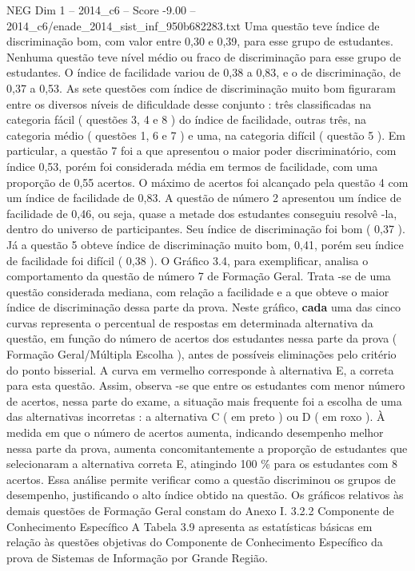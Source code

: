 \begin{textsample}{NEG Dim 1 – 2014\_c6 – Score -9.00 – 2014\_c6/enade\_2014\_sist\_inf\_950b682283.txt}
Uma questão teve índice de discriminação bom, com valor entre 0,30 e 0,39, para esse grupo de estudantes.
Nenhuma questão teve nível médio ou fraco de discriminação para esse grupo de estudantes.
O índice de facilidade variou de 0,38 a 0,83, e o de discriminação, de 0,37 a 0,53.
As sete questões com índice de discriminação muito bom figuraram entre os diversos níveis de dificuldade desse conjunto : três classificadas na categoria fácil ( questões 3, 4 e 8 ) do índice de facilidade, outras três, na categoria médio ( questões 1, 6 e 7 ) e uma, na categoria difícil ( questão 5 ).
Em particular, a questão 7 foi a que apresentou o maior poder discriminatório, com índice 0,53, porém foi considerada média em termos de facilidade, com uma proporção de 0,55 acertos.
O máximo de acertos foi alcançado pela questão 4 com um índice de facilidade de 0,83.
A questão de número 2 apresentou um índice de facilidade de 0,46, ou seja, quase a metade dos estudantes conseguiu resolvê -la, dentro do universo de participantes.
Seu índice de discriminação foi bom ( 0,37 ).
Já a questão 5 obteve índice de discriminação muito bom, 0,41, porém seu índice de facilidade foi difícil ( 0,38 ).
O Gráfico 3.4, para exemplificar, analisa o comportamento da questão de número 7 de Formação Geral.
Trata -se de uma questão considerada mediana, com relação a facilidade e a que obteve o maior índice de discriminação dessa parte da prova.
Neste gráfico, \textbf{cada} uma das cinco curvas representa o percentual de respostas em determinada alternativa da questão, em função do número de acertos dos estudantes nessa parte da prova ( Formação Geral/Múltipla Escolha ), antes de possíveis eliminações pelo critério do ponto bisserial.
A curva em vermelho corresponde à alternativa E, a correta para esta questão.
Assim, observa -se que entre os estudantes com menor número de acertos, nessa parte do exame, a situação mais frequente foi a escolha de uma das alternativas incorretas : a alternativa C ( em preto ) ou D ( em roxo ).
À medida em que o número de acertos aumenta, indicando desempenho melhor nessa parte da prova, aumenta concomitantemente a proporção de estudantes que selecionaram a alternativa correta E, atingindo 100 \% para os estudantes com 8 acertos.
Essa análise permite verificar como a questão discriminou os grupos de desempenho, justificando o alto índice obtido na questão.
Os gráficos relativos às demais questões de Formação Geral constam do Anexo I. 3.2.2 Componente de Conhecimento Específico A Tabela 3.9 apresenta as estatísticas básicas em relação às questões objetivas do Componente de Conhecimento Específico da prova de Sistemas de Informação por Grande Região.

\end{textsample}
